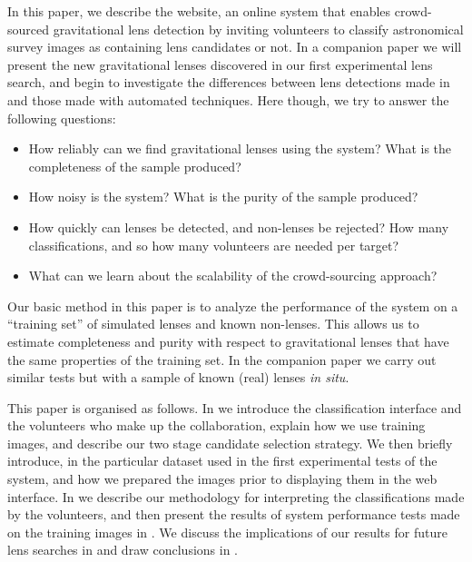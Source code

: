 \documentclass[useAMS,usenatbib,a4paper]{mn2e}
\begin{document}
In this paper, we describe the \sw website, an online system that enables 
crowd-sourced gravitational lens detection by inviting volunteers to classify
astronomical survey images as containing lens candidates or not.  In a
companion paper we will present the new gravitational lenses discovered in our
first experimental lens search, and begin to investigate the differences
between lens detections made in \sw and those made with automated techniques.
Here though, we try to answer the following questions:

\begin{itemize}

\item How reliably can we find gravitational lenses using the \sw
system? What is the completeness of the sample produced?

\item How noisy is the system? What is the purity of the sample
produced?

\item How quickly can lenses be detected, and non-lenses be rejected?
How many classifications, and so how many volunteers are needed per target?

\item What can we learn about the scalability of the crowd-sourcing approach?

\end{itemize}

Our basic method in this paper is to analyze the performance of the \sw system
on a ``training set'' of simulated lenses and known non-lenses. This allows us
to estimate completeness and purity with respect to gravitational lenses that
have the same properties of the training set. In the companion paper we carry
out similar tests but with a sample of known (real) lenses {\it in situ}.

This paper is organised as follows.  In  we introduce the \sw
classification interface and the volunteers who make up the \sw
collaboration,  explain how we use training images, and describe our two stage
candidate selection strategy. We then briefly introduce, in 
the particular dataset used in the first experimental tests of the \sw system,
and how we prepared the images prior to displaying them in the web interface.
In  we describe our methodology for interpreting the
classifications made by the volunteers, and then present the results of system
performance tests  made on the training images in .  We
discuss the implications of our results for future lens searches in
 and draw conclusions in .
\end{document}
